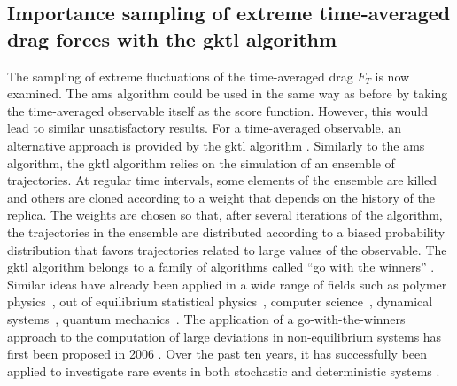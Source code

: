 \documentclass[pre,aps,floatfix,10pt,superscriptaddress, notitlepage,preprint]{revtex4-1}
\begin{document}
\subsection{Importance sampling of extreme time-averaged drag forces with the \acl{gktl} algorithm}
\label{sec:gktl}
The sampling of extreme fluctuations of the time-averaged drag $F_T$ is now examined.
The \ac{ams} algorithm could be used in the same way as before
by taking the time-averaged observable itself as the score function.
However, this would lead to similar unsatisfactory results.
%
For a time-averaged observable,  an alternative approach is provided by the \acf{gktl} algorithm \cite{giardina_direct_2006,tailleur_probing_2007,giardina_simulating_2011}.
%
Similarly to the \ac{ams} algorithm, the \ac{gktl} algorithm relies on the simulation of an ensemble of trajectories.
%
At regular time intervals, some elements of the ensemble are killed and others are cloned according to a weight that depends on the history of the replica.
%
The weights are chosen so that, after several iterations of the algorithm, the trajectories in the ensemble are distributed according to a biased probability distribution that favors trajectories related to large values of the observable.
%
The \ac{gktl} algorithm belongs to a family of algorithms called ``go with the winners'' \cite{aldous1994go,grassberger2002go}.
{Similar ideas have already been applied in a wide range of fields such as polymer physics~\cite{grassberger1998perm}, out of equilibrium statistical physics~\cite{PhysRevLett.118.115702}, computer science~\cite{aldous1994go}, dynamical systems~\cite{tailleur_probing_2007}, quantum mechanics~\cite{intro_DMC_kosztin}.}
The application of a go-with-the-winners approach to the computation of large deviations in non-equilibrium systems has first been proposed in 2006 \cite{giardina_direct_2006}.
Over the past ten years, it has successfully been applied to investigate rare events in both stochastic \cite{giardina_direct_2006,lecomte_numerical_2007,garrahan2007dynamical} and deterministic systems \cite{giardina_direct_2006,tailleur_probing_2007}.
\end{document}
